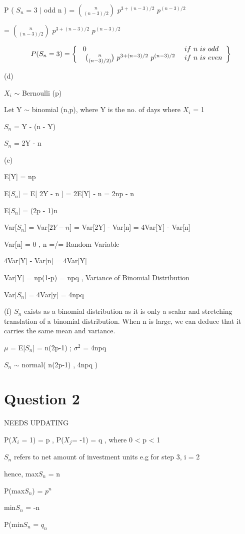\documentclass[a4paper,12pt]{article} %
\begin{document}
\vspace{5mm}

\centerline{ P ( $S_n$ = 3 $\mid$ odd n ) = $n\choose (n-3)/2$  $p^{3+(n-3)/2}$ $p^{(n-3)/2}$ }

\centerline{= $n\choose (n-3)/2$  $p^{3+(n-3)/2}$ $p^{(n-3)/2}$ }

\[ \ P(S_n=3) = \left\{ 
\begin{array}{l l}



\ 0 & if \ n \ is \ odd\\
\  \ {n\choose (n-3)/2 )} \ p^{3+(n-3)/2}\ p^{(n-3)/2}\ & if \ n \ is \ even\\


\end{array} \right\}
\] 


(d)

\centerline {$X_i$ $\sim$ Bernoulli (p)}
\centerline {Let Y $\sim$ binomial (n,p), where Y is the no. of days where $X_i$ = 1}
\centerline {$S_n$ = Y -  (n - Y)  }
\centerline {$S_n$ = 2Y - n}




(e)

\centerline {E[Y] = np}
\centerline {E[$S_n$]  = E[ 2Y - n ] = 2E[Y] - n = 2np - n}
\centerline {E[$S_n$] = (2p - 1)n}

\clearpage
\centerline {Var[$S_n$] = Var[$2Y - n$] = Var[2Y] - Var[n] = 4Var[Y] - Var[n]}
\centerline {Var[n] = 0 , n =/= Random Variable}
\centerline {4Var[Y] - Var[n] = 4Var[Y]}
\centerline {Var[Y] = np(1-p) = npq , Variance of Binomial Distribution}
\centerline {Var[$S_n$] = 4Var[y] = 4npq}

\vspace{5mm}


(f)
\noindent
$S_n$ exists as a binomial distribution as it is only a scalar and stretching translation of a binomial distribution. When n is large, we can deduce that it carries the same mean and variance.

\centerline { $\mu$ = E[$S_n$] = n(2p-1)  ; $\sigma$$^{2}$ = 4npq}
\centerline{ $S_n$ $\sim$ normal( n(2p-1) , 4npq )}


\section{Question 2} 

\centerline {NEEDS UPDATING }
\centerline {P($X_i$ = 1) = p , P($X_j$= -1) = q , where 0 < p < 1}
\centerline {$S_n$ refers to net amount of investment units e.g for step 3, i = 2}
\centerline {hence, max$S_n$ = n}
\centerline {P(max$S_n$) = {$p^{n}$} }
\centerline {min$S_n$ = -n}
\centerline { P(min$S_n$ = $q_n$}
\vspace{5mm}
\end{document}
